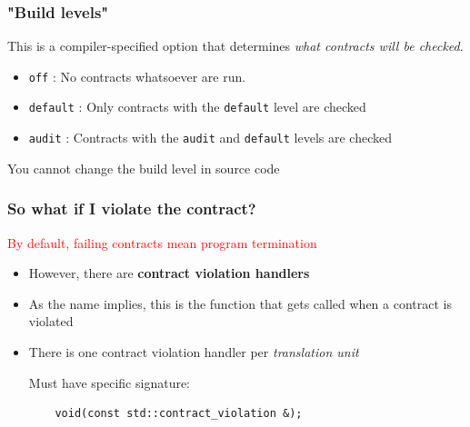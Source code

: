 \documentclass{beamer}
\begin{document}
\begin{frame}
\frametitle{"Build levels"}

This is a compiler-specified option that determines \textit{what contracts will be checked}.

\begin{itemize}
\item \texttt{off} : No contracts whatsoever are run.

\item \texttt{default} : Only contracts with the \texttt{default} level are checked

\item \texttt{audit} : Contracts with the \texttt{audit} and \texttt{default} levels are checked
\end{itemize}

\vspace{2em}
You {\Large{cannot}} change the build level in source code

\end{frame}


\begin{frame}[fragile]
\frametitle{So what if I violate the contract?}

\textcolor{red}{By default, failing contracts mean program termination}
\begin{itemize}


\item However, there are \textbf{contract violation handlers}

\item As the name implies, this is the function that gets called when a contract is violated

\item There is one contract violation handler per \textit{translation unit}

Must have specific signature:

\begin{lstlisting}
    void(const std::contract_violation &);
\end{lstlisting}

\end{itemize}
\end{frame}
\end{document}

